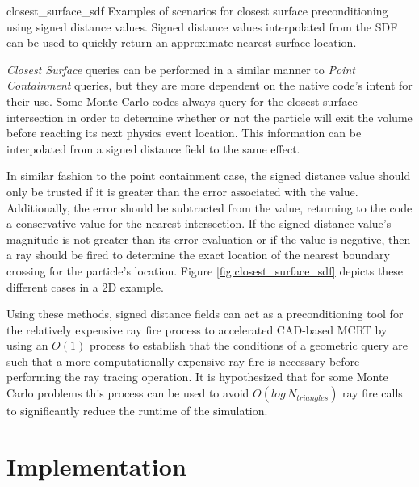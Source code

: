              {closest_surface_sdf}
             {Examples of scenarios for closest surface preconditioning using
               signed distance values. Signed distance values interpolated from
               the SDF can be used to quickly return an approximate nearest
               surface location.}
             {
               \textit{Closest Surface} queries can be performed in a similar manner to
               \textit{Point Containment} queries, but they are more dependent on the
               native code's intent for their use. Some Monte Carlo codes always
               query for the closest surface intersection in order to
               determine whether or not the particle will exit the volume before
               reaching its next physics event location. This information can be
               interpolated from a signed distance field to the same effect.
               
               In similar fashion to the point containment case, the signed
               distance value should only be trusted if it is greater than the
               error associated with the value. Additionally, the error should
               be subtracted from the value, returning to the code a
               conservative value for the nearest intersection. If the signed
               distance value's magnitude is not greater than its error
               evaluation or if the value is negative, then a ray should be
               fired to determine the exact location of the nearest boundary
               crossing for the particle's location. Figure
               \ref{fig:closest_surface_sdf} depicts these different cases in a
               2D example.
             }
             
Using these methods, signed distance fields can act as a preconditioning tool
for the relatively expensive ray fire process to accelerated CAD-based MCRT by
using an $O(1)$ process to establish that the conditions of a geometric query
are such that a more computationally expensive ray fire is necessary before
performing the ray tracing operation. It is hypothesized that for some Monte
Carlo problems this process can be used to avoid $O(log \, N_{triangles})$ ray fire calls to
significantly reduce the runtime of the simulation.

\section{Implementation}

